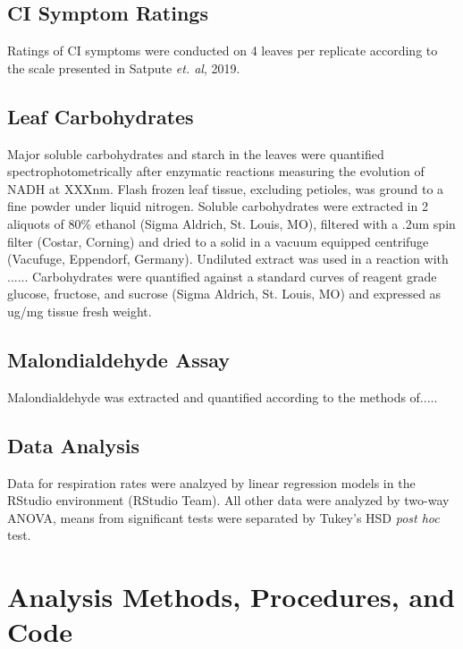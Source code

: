 \documentclass{article}\usepackage[]{graphicx}\usepackage[]{color}
\begin{document}
\subsection{CI Symptom Ratings}
Ratings of CI symptoms were conducted on 4 leaves per replicate according to the scale presented in Satpute \emph{et. al}, 2019.

\subsection{Leaf Carbohydrates}
Major soluble carbohydrates and starch in the leaves were quantified spectrophotometrically after enzymatic reactions measuring the evolution of NADH at XXXnm. Flash frozen leaf tissue, excluding petioles, was ground to a fine powder under liquid nitrogen. Soluble carbohydrates were extracted in 2 aliquots of 80\% ethanol (Sigma Aldrich, St. Louis, MO), filtered with a .2um spin filter (Costar, Corning) and dried to a solid in a vacuum equipped centrifuge (Vacufuge, Eppendorf, Germany). Undiluted extract was used in a reaction with ......
Carbohydrates were quantified against a standard curves of reagent grade glucose, fructose, and sucrose (Sigma Aldrich, St. Louis, MO) and expressed as ug/mg tissue fresh weight.

\subsection{Malondialdehyde Assay}
Malondialdehyde was extracted and quantified according to the methods of.....

\subsection{Data Analysis}
Data for respiration rates were analzyed by linear regression models in the RStudio environment (RStudio Team). All other data were analyzed by two-way ANOVA, means from significant tests were separated by Tukey's HSD \emph{post hoc} test.

\section{Analysis Methods, Procedures, and Code}
\end{document}
